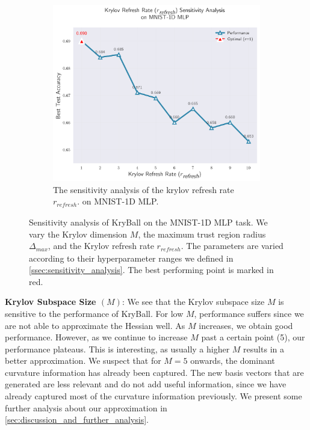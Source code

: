 \begin{figure}[!t]
\begin{subfigure}[b]{0.49\linewidth}
        \includegraphics[width=\linewidth]{figures/5evals/sens_refresh.png}
        \caption{The sensitivity analysis of the krylov refresh rate $r_{\mathit{refresh}}$. on MNIST-1D MLP.}
        \label{fig:sens_r_refresh}
    \end{subfigure}
    \caption{Sensitivity analysis of KryBall on the MNIST-1D MLP task. We vary the Krylov dimension $M$, the maximum trust region radius $\Delta_{\mathit{max}}$, and the Krylov refresh rate $r_{\mathit{refresh}}$. The parameters are varied according to their hyperparameter ranges we defined in \cref{ssec:sensitivity_analysis}. The best performing point is marked in red.}
    \label{fig:sensitivity_analysis}
\end{figure}

\textbf{Krylov Subspace Size $(M)$}: We see that the Krylov subspace size $M$ is sensitive to the performance of KryBall. For low $M$, performance suffers since we are not able to approximate the Hessian well. As $M$ increases, we obtain good performance. However, as we continue to increase $M$ past a certain point (5), our performance plateaus. This is interesting, as usually a higher $M$ results in a better approximation. We suspect that for $M=5$ onwards, the dominant curvature information has already been captured. The new basis vectors that are generated are less relevant and do not add useful information, since we have already captured most of the curvature information previously. We present some further analysis about our approximation in \cref{sec:discussion_and_further_analysis}.
 

